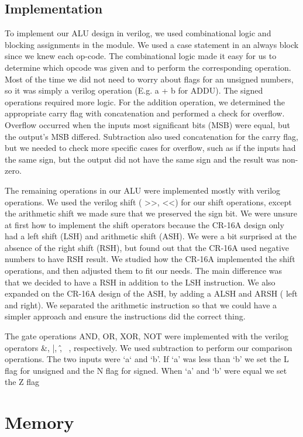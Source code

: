 \documentclass[11pt]{article}
\begin{document}
\subsection{Implementation}
To implement our ALU design in verilog, we used combinational logic and blocking assignments in the module. We used a case statement in an always block since we knew each op-code. The combinational logic made it easy for us to determine which opcode was given and to perform the corresponding operation. Most of the time we did not need to worry about flags for  an unsigned numbers, so it was simply a verilog operation (E.g. a + b for ADDU). The signed operations required more logic. For the addition operation, we determined the appropriate carry flag with concatenation and performed a check for overflow. Overflow occurred when the inputs most significant bits (MSB) were equal, but the output’s MSB differed. Subtraction also used concatenation for the carry flag, but we needed to check more specific cases for overflow, such as if the inputs had the same sign, but the output did not have the same sign and the result was non-zero.

The remaining operations in our ALU were implemented mostly with verilog operations. We used the verilog shift ( >>, <<) for our shift operations, except the arithmetic shift we made sure that we preserved the sign bit. We were unsure at first how to implement the shift operators because the CR-16A design only had a left shift  (LSH) and arithmetic shift (ASH). We were a bit surprised at the absence of the right shift (RSH), but found out that the CR-16A used negative numbers to have RSH result.  We studied how the CR-16A implemented the shift operations, and then adjusted them to fit our needs. The main difference was that we decided to have a RSH in addition to the LSH instruction. We also expanded on the CR-16A design of the ASH, by adding a ALSH and ARSH ( left and right). We separated the arithmetic instruction so that we could have a simpler approach and ensure the instructions did the correct thing. 

The gate operations AND, OR, XOR, NOT were implemented with the verilog operators \&, |, \^ , ~, respectively. We used subtraction to perform our comparison operations. The two inputs were ‘a‘ and ‘b’. If ‘a’ was less than ‘b’ we set the L flag for unsigned and the N flag for signed. When ‘a’ and ‘b’ were equal we set the Z flag
\section{Memory}
\end{document}
